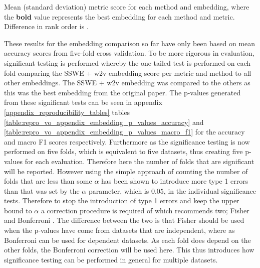 \FloatBarrier
\begin{table}[!h]
    \centering
    
    \caption{Mean (standard deviation) metric score for each method and embedding, where the \textbf{bold} value represents the best embedding for each method and metric. Difference in rank order is .}
    \label{table:repro_vo_word_embeddings_results}
\end{table}
\FloatBarrier

These results for the embedding comparison so far have only been based on mean accuracy scores from five-fold cross validation. To be more rigorous in evaluation, significant testing is performed whereby the one tailed test is performed on each fold comparing the SSWE + w2v embedding score per metric and method to all other embeddings. The SSWE + w2v embedding was compared to the others as this was the best embedding from the original paper. The p-values generated from these significant tests can be seen in appendix \ref{appendix_reproducibility_tables} tables \ref{table:repro_vo_appendix_embedding_p_values_accuracy} and \ref{table:repro_vo_appendix_embedding_p_values_macro_f1} for the accuracy and macro F1 scores respectively. Furthermore as the significance testing is now performed on five folds, which is equivalent to five datasets, thus creating five p-values for each evaluation. Therefore here the number of folds that are significant will be reported. However using the simple approach of counting the number of folds that are less than some $\alpha$ has been shown to introduce more type 1 errors \citep{dror-etal-2017-replicability} than that was set by the $\alpha$ parameter, which is $0.05$, in the individual significance tests. Therefore to stop the introduction of type 1 errors and keep the upper bound to $\alpha$ a correction procedure is required of which \citet{dror-etal-2018-hitchhikers} recommends two; Fisher and Bonferroni \citep{benjamini2008screening}. The difference between the two is that Fisher should be used when the p-values have come from datasets that are independent, where as Bonferroni can be used for dependent datasets. As each fold does depend on the other folds, the Bonferroni correction will be used here. This thus introduces how significance testing can be performed in general for multiple datasets.

